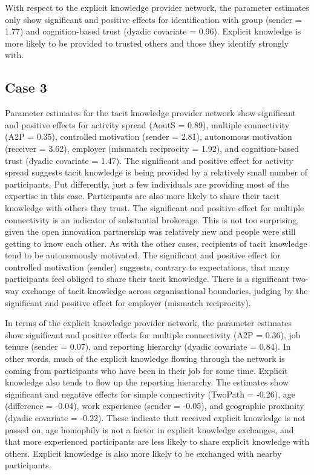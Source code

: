 With respect to the explicit knowledge provider network, the parameter estimates only show significant and positive effects for identification with group (sender = 1.77) and cognition-based trust (dyadic covariate = 0.96). Explicit knowledge is more likely to be provided to trusted others and those they identify strongly with. 

\subsection{Case 3}

Parameter estimates for the tacit knowledge provider network show significant and positive effects for activity spread (AoutS = 0.89), multiple connectivity (A2P = 0.35), controlled motivation (sender = 2.81), autonomous motivation (receiver = 3.62), employer (mismatch reciprocity = 1.92), and cognition-based trust (dyadic covariate = 1.47). The significant and positive effect for activity spread suggests tacit knowledge is being provided by a relatively small number of participants. Put differently, just a few individuals are providing most of the expertise in this case. Participants are also more likely to share their tacit knowledge with others they trust. The significant and positive effect for multiple connectivity is an indicator of substantial brokerage. This is not too surprising, given the open innovation partnership was relatively new and people were still getting to know each other. As with the other cases, recipients of tacit knowledge tend to be autonomously motivated. The significant and positive effect for controlled motivation (sender) suggests, contrary to expectations, that many participants feel obliged to share their tacit knowledge. There is a significant two-way exchange of tacit knowledge across organisational boundaries, judging by the significant and positive effect for employer (mismatch reciprocity). \medskip

In terms of the explicit knowledge provider network, the parameter estimates show significant and positive effects for multiple connectivity (A2P = 0.36), job tenure (sender = 0.07), and reporting hierarchy (dyadic covariate = 0.84). In other words, much of the explicit knowledge flowing through the network is coming from participants who have been in their job for some time. Explicit knowledge also tends to flow up the reporting hierarchy. The estimates show significant and negative effects for simple connectivity (TwoPath = -0.26), age (difference = -0.04), work experience (sender = -0.05), and geographic proximity (dyadic covariate = -0.22). These indicate that received explicit knowledge is not passed on, age homophily is not a factor in explicit knowledge exchanges, and that more experienced participants are less likely to share explicit knowledge with others. Explicit knowledge is also more likely to be exchanged with nearby participants. 

